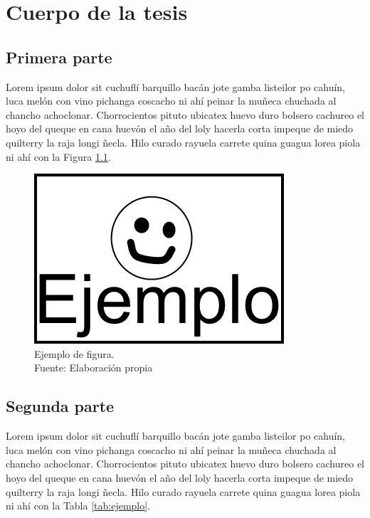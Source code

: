 \chapter{Cuerpo de la tesis}
\label{cap:cuerpo}

\section{Primera parte}
\label{sec:primera}

Lorem ipsum dolor sit cuchufl\'i barquillo bac\'an jote gamba listeilor po cahu\'in, luca mel\'on con vino pichanga coscacho ni ah\'i peinar la muñeca chuchada al chancho achoclonar. Chorrocientos pituto ubicatex huevo duro bolsero cachureo el hoyo del queque en cana huev\'on el año del loly hacerla corta impeque de miedo quilterry la raja longi ñecla. Hilo curado rayuela carrete quina guagua lorea piola ni ah\'i con la Figura \ref{fig:ejemplo}.

\begin{figure}[!ht]
	\centering
	\captionsetup{justification=centering}
	\includegraphics[scale=0.6]{images/Ejemplo.png}
	\caption[Ejemplo de figura.]{Ejemplo de figura.\\Fuente: Elaboraci\'on propia}
	\label{fig:ejemplo}
\end{figure}

\section{Segunda parte}
\label{sec:segunda}

Lorem ipsum dolor sit cuchufl\'i barquillo bac\'an jote gamba listeilor po cahu\'in, luca mel\'on con vino pichanga coscacho ni ah\'i peinar la muñeca chuchada al chancho achoclonar. Chorrocientos pituto ubicatex huevo duro bolsero cachureo el hoyo del queque en cana huev\'on el año del loly hacerla corta impeque de miedo quilterry la raja longi ñecla. Hilo curado rayuela carrete quina guagua lorea piola ni ah\'i con la Tabla \ref{tab:ejemplo}.

